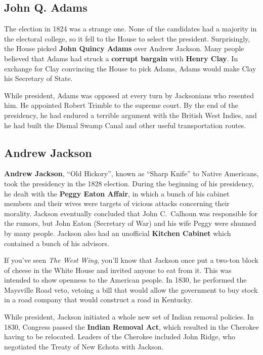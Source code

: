 \subsection*{John Q. Adams}

The election in 1824 was a strange one.
None of the candidates had a majority in the electoral college, so it fell to the House to select the president.
Surprisingly, the House picked \textbf{John Quincy Adams} over Andrew Jackson.
Many people believed that Adams had struck a \textbf{corrupt bargain} with \textbf{Henry Clay}.
In exchange for Clay convincing the House to pick Adams, Adams would make Clay his Secretary of State.

While president, Adams was opposed at every turn by Jacksonians who resented him.
He appointed Robert Trimble to the supreme court.
By the end of the presidency, he had endured a terrible argument with the British West Indies,
and he had built the Dismal Swamp Canal and other useful transportation routes.

\subsection*{Andrew Jackson}

\textbf{Andrew Jackson}, ``Old Hickory'', known as ``Sharp Knife'' to Native Americans,
took the presidency in the 1828 election.
During the beginning of his presidency, he dealt with the \textbf{Peggy Eaton Affair},
in which a bunch of his cabinet members and their wives were targets of vicious attacks concerning their morality.
Jackson eventually concluded that John C.\ Calhoun was responsible for the rumors,
but John Eaton (Secretary of War) and his wife Peggy were shunned by many people.
Jackson also had an unofficial \textbf{Kitchen Cabinet} which contained a bunch of his advisors.

If you've seen \textit{The West Wing},
you'll know that Jackson once put a two-ton block of cheese in the White House and invited anyone to eat from it.
This was intended to show openness to the American people.
In 1830, he performed the Maysville Road veto,
vetoing a bill that would allow the government to buy stock in a road company that would construct a road in Kentucky.

While president, Jackson initiated a whole new set of Indian removal policies.
In 1830, Congress passed the \textbf{Indian Removal Act}, which resulted in the Cherokee having to be relocated.
Leaders of the Cherokee included John Ridge, who negotiated the Treaty of New Echota with Jackson.

